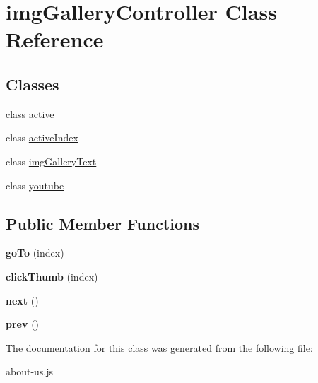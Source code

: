 \hypertarget{classimgGalleryController}{\section{img\-Gallery\-Controller Class Reference}
\label{classimgGalleryController}
}
\subsection*{Classes}
\begin{DoxyCompactItemize}
\item 
class \hyperlink{classimgGalleryController_1_1active}{active}
\item 
class \hyperlink{classimgGalleryController_1_1activeIndex}{active\-Index}
\item 
class \hyperlink{classimgGalleryController_1_1imgGalleryText}{img\-Gallery\-Text}
\item 
class \hyperlink{classimgGalleryController_1_1youtube}{youtube}
\end{DoxyCompactItemize}
\subsection*{Public Member Functions}
\begin{DoxyCompactItemize}
\item 
\hypertarget{classimgGalleryController_ab6c581971fd19d951b6ed6beefd834b4}{{\bfseries go\-To} (index)}\label{classimgGalleryController_ab6c581971fd19d951b6ed6beefd834b4}

\item 
\hypertarget{classimgGalleryController_a7dbd55de3e57dcbf66c97716625790b2}{{\bfseries click\-Thumb} (index)}\label{classimgGalleryController_a7dbd55de3e57dcbf66c97716625790b2}

\item 
\hypertarget{classimgGalleryController_ab623e0fb4a884ea433b9d5eeefd52de3}{{\bfseries next} ()}\label{classimgGalleryController_ab623e0fb4a884ea433b9d5eeefd52de3}

\item 
\hypertarget{classimgGalleryController_abfd44f456a7f00edfe4906730ba078b3}{{\bfseries prev} ()}\label{classimgGalleryController_abfd44f456a7f00edfe4906730ba078b3}

\end{DoxyCompactItemize}


The documentation for this class was generated from the following file\-:\begin{DoxyCompactItemize}
\item 
about-\/us.\-js\end{DoxyCompactItemize}

